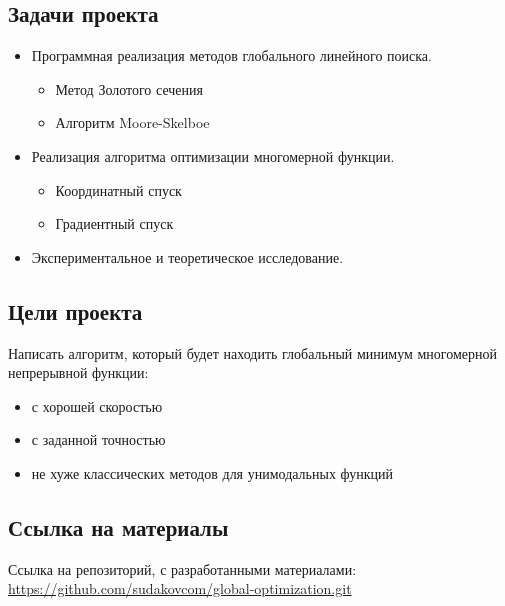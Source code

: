 \documentclass{article}
\begin{document}
    \subsection{Задачи проекта}
    \begin{itemize}
        \item Программная реализация методов глобального линейного поиска.
        \begin{itemize}
            \item Метод Золотого сечения
            \item Алгоритм Moore-Skelboe
        \end{itemize}
        \item Реализация алгоритма оптимизации многомерной функции.
        \begin{itemize}
            \item Координатный спуск
            \item Градиентный спуск
        \end{itemize}
        \item Экспериментальное и теоретическое исследование.
    \end{itemize}

    \subsection{Цели проекта}
    Написать алгоритм, который будет находить глобальный минимум многомерной непрерывной функции:
    \begin{itemize}
        \item с хорошей скоростью
        \item с заданной точностью
        \item не хуже классических методов для унимодальных функций
    \end{itemize}

    \subsection{Ссылка на материалы}
    Ссылка на репозиторий, с разработанными материалами:\\
    \href{https://github.com/sudakovcom/global-optimization.git}{https://github.com/sudakovcom/global-optimization.git}








    \newpage
\end{document}
